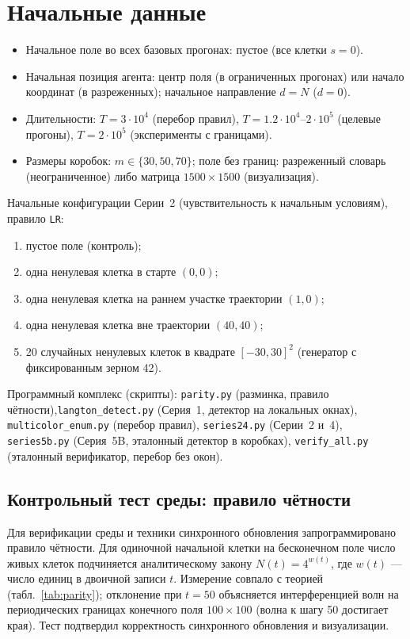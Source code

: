 \documentclass[12pt,a4paper]{article}
\begin{document}
	\section{Начальные данные}

	
	\begin{itemize}
		\item Начальное поле во всех базовых прогонах: пустое (все клетки $s=0$).
		\item Начальная позиция агента: центр поля (в ограниченных прогонах) или начало координат (в разреженных); начальное направление $d=N$ ($d=0$).
		\item Длительности: $T=3\cdot10^4$ (перебор правил), $T=1.2\cdot10^4$--$2\cdot10^5$ (целевые прогоны), $T=2\cdot10^5$ (эксперименты с границами).
		\item Размеры коробок: $m\in\{30,50,70\}$; поле без границ: разреженный словарь (неограниченное) либо матрица $1500\times1500$ (визуализация).
	\end{itemize}
	
	Начальные конфигурации Серии~2 (чувствительность к начальным условиям), правило \texttt{LR}:
	\begin{enumerate}
		\item пустое поле (контроль);
		\item одна ненулевая клетка в старте $(0,0)$;
		\item одна ненулевая клетка на раннем участке траектории $(1,0)$;
		\item одна ненулевая клетка вне траектории $(40,40)$;
		\item 20 случайных ненулевых клеток в квадрате $[-30,30]^2$ (генератор с фиксированным зерном 42).
	\end{enumerate}
	
	Программный комплекс (скрипты): \texttt{parity.py} (разминка, правило чётности),\texttt{langton\_detect.py} (Серия~1, детектор на локальных окнах), \texttt{multicolor\_enum.py} (перебор правил), \texttt{series24.py} (Серии~2 и~4), \texttt{series5b.py} (Серия~5B, эталонный детектор в коробках), \texttt{verify\_all.py} (эталонный верификатор, перебор без окон).
	
	\subsection{Контрольный тест среды: правило чётности}
	Для верификации среды и техники синхронного обновления запрограммировано правило чётности. Для одиночной начальной клетки на бесконечном поле число живых клеток подчиняется аналитическому закону $N(t)=4^{w(t)}$, где $w(t)$ --- число единиц в двоичной записи $t$. Измерение совпало с теорией (табл.~\ref{tab:parity}); отклонение при $t=50$ объясняется интерференцией волн на периодических границах конечного поля $100\times100$ (волна к шагу 50 достигает края). Тест подтвердил корректность синхронного обновления и визуализации.
	
\end{document}
